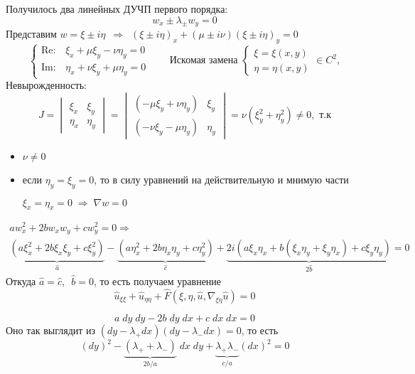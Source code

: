 \documentclass[../main.tex]{subfiles}
\begin{document}
Получилось два линейных ДУЧП первого порядка: $$w_x \pm \lambda_\pm w_y = 0 $$
Представим $w = \xi \pm i\eta \;\ \Rightarrow\;\ 
(\xi \pm i\eta)_x + (\mu \pm i\nu)(\xi \pm i\eta)_y = 0$
$$
\begin{cases}
    \mathrm{Re:} & \xi_x + \mu\xi_y - \nu\eta_y = 0\\
    \mathrm{Im:} & \eta_x + \nu\xi_y + \mu\eta_y = 0
\end{cases}\qquad \text{Искомая замена }
\begin{cases}
    \xi = \xi(x, y) \\
    \eta = \eta(x, y)
\end{cases} \in C^2,
$$
Невырожденность:
$$ J = 
\begin{vmatrix}
    \xi_x & \xi_y \\
    \eta_x & \eta_y
\end{vmatrix} =
\begin{vmatrix}
    (-\mu\xi_y + \nu\eta_y) & \xi_y \\
    (-\nu\xi_y - \mu\eta_y) & \eta_y
\end{vmatrix} =
\nu (\xi_y^2 + \eta_y^2) \neq 0, \text{ т.к} $$
\begin{itemize}[nolistsep]
    \item $\nu \neq 0$
    \item если $\eta_y = \xi_y = 0$, то в силу уравнений на действительную и мнимую части
    
    $\xi_x = \eta_x = 0 \; \Rightarrow \; \nabla w = 0$
\end{itemize}
\begin{multline*}
a w_x^2 + 2bw_x w_y + c w_y^2 = 0 \Rightarrow \\
\underbrace{(a\xi^2_x + 2b\xi_x\xi_y + c\xi_y^2)}_{\hat a} -
\underbrace{(a\eta_x^2 + 2b\eta_x\eta_y + c\eta_y^2)}_{\hat c}+ 
\underbrace{2i(a\xi_x \eta_x + b(\xi_x\eta_y + \xi_y\eta_x) + c\xi_y\eta_y)}_{2\hat b} = 0
\end{multline*}
Откуда $\hat a = \hat c,\;\ \hat b = 0$, то есть получаем уравнение
$$
\hat u_{\xi\xi} + \hat u_{\eta\eta} + \hat F(\xi, \eta, \hat u, \nabla_{\xi\eta}\hat u) = 0
$$

$$
a\;dy\;dy - 2b\;dy\;dx + c\;dx\;dx =0
$$
Оно так выглядит из $(dy - \lambda_+dx)(dy - \lambda_-dx)=0$, то есть 
$$
(dy)^2 - \underbrace{(\lambda_+ + \lambda_-)}_{2b/a}\;dx\;dy + \underbrace{\lambda_+\lambda_-}_{c/a}(dx)^2 = 0
$$
\end{document}
